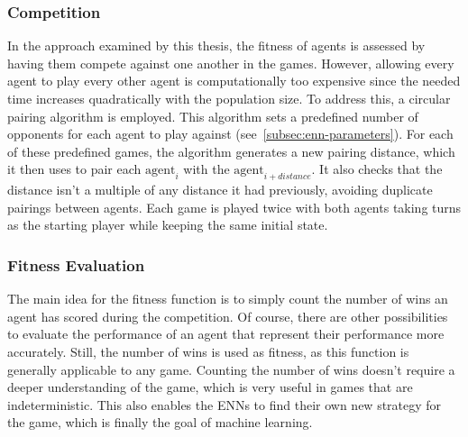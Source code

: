 \subsubsection{Competition}
In the approach examined by this thesis, the fitness of agents is assessed by having them compete against one another in the games.
However, allowing every agent to play every other agent is computationally too expensive since the needed time increases quadratically with the population size.
To address this, a circular pairing algorithm is employed.
This algorithm sets a predefined number of opponents for each agent to play against (see~\ref{subsec:enn-parameters}).
For each of these predefined games, the algorithm generates a new pairing distance, which it then uses to pair each $\textrm{agent}_i$ with the $\textrm{agent}_{i+distance}$.
It also checks that the distance isn't a multiple of any distance it had previously, avoiding duplicate pairings between agents.
Each game is played twice with both agents taking turns as the starting player while keeping the same initial state.

\subsubsection{Fitness Evaluation}
The main idea for the fitness function is to simply count the number of wins an agent has scored during the competition.
Of course, there are other possibilities to evaluate the performance of an agent that represent their performance more accurately.
Still, the number of wins is used as fitness, as this function is generally applicable to any game.
Counting the number of wins doesn't require a deeper understanding of the game, which is very useful in games that are indeterministic.
This also enables the ENNs to find their own new strategy for the game, which is finally the goal of machine learning.


